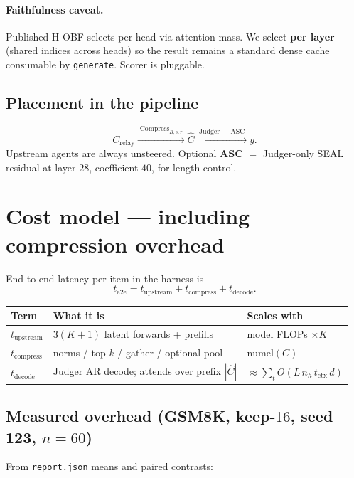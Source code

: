 \documentclass[11pt]{article}
\begin{document}
\paragraph{Faithfulness caveat.}
Published H-OBF selects per-head via attention mass. We select \textbf{per
layer} (shared indices across heads) so the result remains a standard dense
cache consumable by \texttt{generate}. Scorer is pluggable.

\subsection{Placement in the pipeline}
\[
C_{\mathrm{relay}}
  \xrightarrow{\;\mathrm{Compress}_{B,s,r}\;}
  \widehat C
  \xrightarrow{\;\mathrm{Judger}\,\pm\,\mathrm{ASC}\;}
  y.
\]
Upstream agents are always unsteered. Optional \textbf{ASC} $=$ Judger-only
SEAL residual at layer $28$, coefficient $40$, for length control.

\section{Cost model --- including compression overhead}

End-to-end latency per item in the harness is
\[
t_{\mathrm{e2e}}
  = t_{\mathrm{upstream}}
  + t_{\mathrm{compress}}
  + t_{\mathrm{decode}}.
\]

\begin{center}
\begin{tabular}{@{}lll@{}}
\toprule
Term & What it is & Scales with \\
\midrule
$t_{\mathrm{upstream}}$
  & $3(K{+}1)$ latent forwards + prefills
  & model FLOPs $\times K$ \\
$t_{\mathrm{compress}}$
  & norms / top-$k$ / gather / optional pool
  & $\mathrm{numel}(C)$ \\
$t_{\mathrm{decode}}$
  & Judger AR decode; attends over prefix $|\widehat C|$
  & $\approx\sum_t O(L\,n_h\,t_{\mathrm{ctx}}\,d)$ \\
\bottomrule
\end{tabular}
\end{center}

\subsection{Measured overhead (GSM8K, keep-$16$, seed 123, $n{=}60$)}

From \texttt{report.json} means and paired contrasts:
\end{document}
